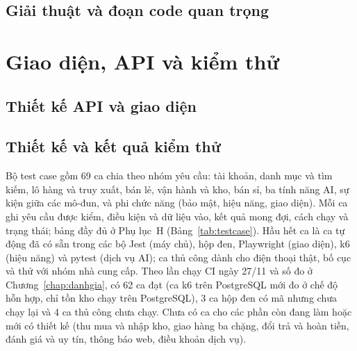\subsection{Giải thuật và đoạn code quan trọng}
\label{sec:giaithuat}


\section{Giao diện, API và kiểm thử}

\subsection{Thiết kế API và giao diện}

\subsection{Thiết kế và kết quả kiểm thử}
\label{sec:kichbankiemthu}
\label{sec:ketquachucnang}
Bộ test case gồm 69 ca chia theo nhóm yêu cầu: tài khoản, danh mục và tìm kiếm, lô hàng và truy xuất, bán lẻ, vận hành và kho, bán sỉ, ba tính năng AI, sự kiện giữa các mô-đun, và phi chức năng (bảo mật, hiệu năng, giao diện). Mỗi ca ghi yêu cầu được kiểm, điều kiện và dữ liệu vào, kết quả mong đợi, cách chạy và trạng thái; bảng đầy đủ ở Phụ lục~H (Bảng~\ref{tab:testcase}). Hầu hết ca là ca tự động đã có sẵn trong các bộ Jest (máy chủ), hộp đen, Playwright (giao diện), k6 (hiệu năng) và pytest (dịch vụ AI); ca thủ công dành cho điện thoại thật, bố cục và thử với nhóm nhà cung cấp. Theo lần chạy CI ngày 27/11 và số đo ở Chương~\ref{chap:danhgia}, có 62 ca đạt (ca k6 trên PostgreSQL mới đo ở chế độ hỗn hợp, chỉ tồn kho chạy trên PostgreSQL), 3 ca hộp đen có mã nhưng chưa chạy lại và 4 ca thủ công chưa chạy. Chưa có ca cho các phần còn đang làm hoặc mới có thiết kế (thu mua và nhập kho, giao hàng ba chặng, đổi trả và hoàn tiền, đánh giá và uy tín, thông báo web, điều khoản dịch vụ).

